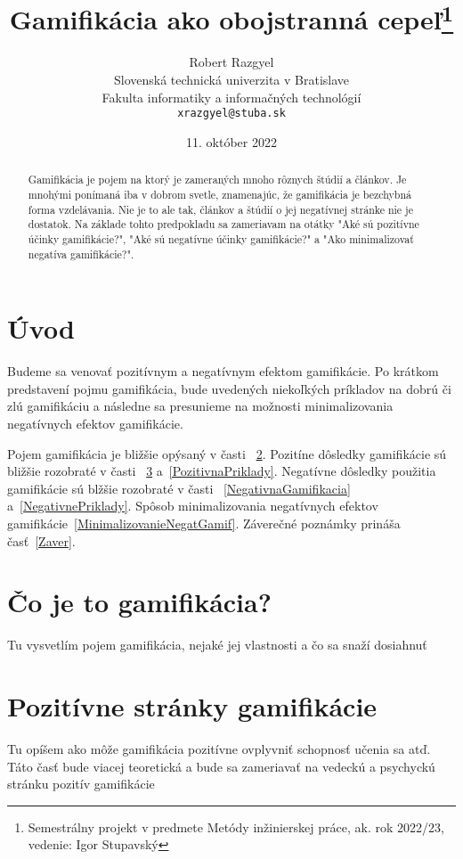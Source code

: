 \documentclass[10pt,twoside,slovak,a4paper]{article}
\title{Gamifikácia ako obojstranná cepeľ\thanks{Semestrálny projekt v predmete Metódy inžinierskej práce, ak. rok 2022/23, vedenie: Igor Stupavský}} %
\author{Robert Razgyel\\[2pt]
	{\small Slovenská technická univerzita v Bratislave}\\
	{\small Fakulta informatiky a informačných technológií}\\
	{\small \texttt{xrazgyel@stuba.sk}}
	}
\date{\small 11. október 2022} %
\begin{document}
\maketitle

\begin{abstract}
Gamifikácia je pojem na ktorý je zameraných mnoho rôznych štúdií a článkov. Je mnohými ponímaná iba v dobrom svetle, znamenajúc, že gamifikácia je bezchybná forma vzdelávania. Nie je to ale tak, článkov a štúdií o jej negatívnej stránke nie je dostatok. Na základe tohto predpokladu sa zameriavam na otátky "Aké sú pozitívne účinky gamifikácie?", "Aké sú negatívne účinky gamifikácie?" a "Ako minimalizovať negatíva gamifikácie?". 
\end{abstract}



\section{Úvod}

Budeme sa venovať pozitívnym a negatívnym efektom gamifikácie. Po krátkom predstavení pojmu gamifikácia, bude uvedených niekoľkých príkladov na dobrú či zlú gamifikáciu a následne sa presunieme na možnosti minimalizovania negatívnych efektov gamifikácie.

Pojem gamifikácia je bližšie opýsaný v časti ~\ref{CoJeGamifikacia}.
Pozitíne dôsledky gamifikácie sú bližšie rozobraté v časti ~\ref{PozitivnaGamifikacia} a~\ref{PozitivnaPriklady}.
Negatívne dôsledky použitia gamifikácie sú blžšie rozobraté v časti ~\ref{NegativnaGamifikacia} a~\ref{NegativnePriklady}.
Spôsob minimalizovania negatívnych efektov gamifikácie~\ref{MinimalizovanieNegatGamif}.
Záverečné poznámky prináša časť~\ref{Zaver}.

\section{Čo je to gamifikácia?} \label{CoJeGamifikacia}

Tu vysvetlím pojem gamifikácia, nejaké jej vlastnosti a čo sa snaží dosiahnuť

\section{Pozitívne stránky gamifikácie} \label{PozitivnaGamifikacia}


Tu opíšem ako môže gamifikácia pozitívne ovplyvniť schopnosť učenia sa atď.
Táto časť bude viacej teoretická a bude sa zameriavať na vedeckú a psychyckú stránku pozitív gamifikácie
\end{document}
